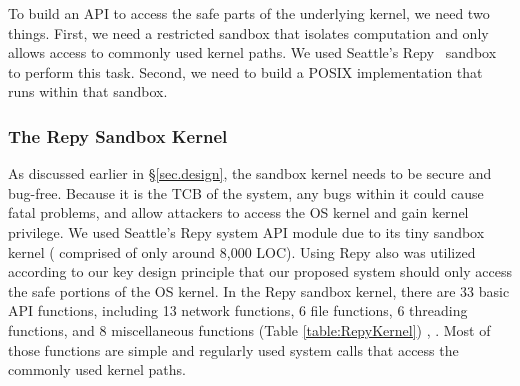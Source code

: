 To build an API to access the safe parts of the underlying kernel, we need 
two things.  First, we need a restricted sandbox that isolates computation
and only allows access to commonly used kernel paths.  We used 
Seattle's Repy~\cite{Repy-10} sandbox to perform this task.
Second, we need to build a POSIX implementation that runs within that sandbox.  


\subsubsection{The Repy Sandbox Kernel}

As discussed earlier in \S{\ref{sec.design}}, the sandbox kernel needs to be secure and bug-free. 
Because it is the TCB of the system, any bugs within it could cause fatal problems, 
and allow attackers to access the OS kernel and gain kernel privilege. 
We used Seattle's Repy system API module due to its tiny sandbox kernel ( 
comprised of only around 8,000 LOC). Using Repy also was utilized according to our key design principle that 
our proposed system should only access the safe portions of the OS kernel. In the Repy sandbox kernel, 
there are 33 basic API functions, including 13 network functions, 6 file functions, 6 threading functions, 
and 8 miscellaneous functions (Table \ref{table:RepyKernel}) \cite{Repy-10}, \cite{RepyKernel}. Most of those functions are simple and 
regularly used system calls that access the commonly used kernel paths. 


